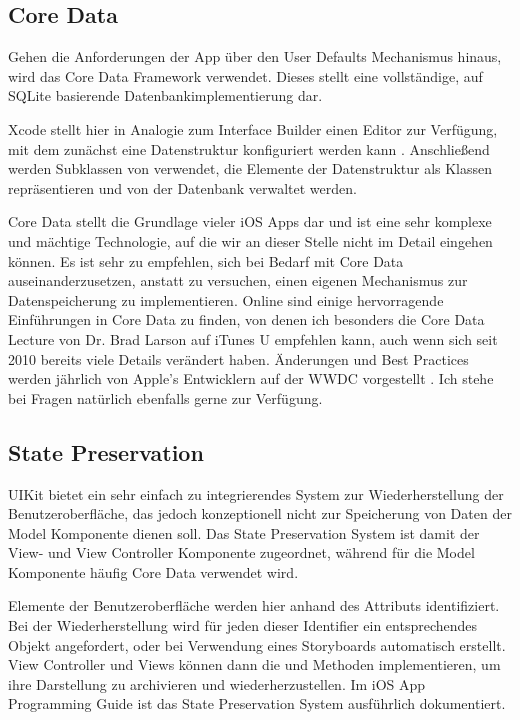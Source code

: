\documentclass[parskip=half, final]{scrreprt}
\begin{document}
\subsection{Core Data}\label{sec:coredata}

Gehen die Anforderungen der App über den User Defaults Mechanismus hinaus, wird das Core Data Framework verwendet. Dieses stellt eine vollständige, auf SQLite basierende Datenbankimplementierung dar.

Xcode stellt hier in Analogie zum Interface Builder einen Editor zur Verfügung, mit dem zunächst eine Datenstruktur konfiguriert werden kann . Anschließend werden Subklassen von  verwendet, die Elemente der Datenstruktur als Klassen repräsentieren und von der Datenbank verwaltet werden.


Core Data stellt die Grundlage vieler iOS Apps dar und ist eine sehr komplexe und mächtige Technologie, auf die wir an dieser Stelle nicht im Detail eingehen können. Es ist sehr zu empfehlen, sich bei Bedarf mit Core Data auseinanderzusetzen, anstatt zu versuchen, einen eigenen Mechanismus zur Datenspeicherung zu implementieren. Online sind einige hervorragende Einführungen in Core Data zu finden, von denen ich besonders die Core Data Lecture von Dr. Brad Larson auf iTunes U  empfehlen kann, auch wenn sich seit 2010 bereits viele Details verändert haben. Änderungen und Best Practices werden jährlich von Apple's Entwicklern auf der WWDC vorgestellt . Ich stehe bei Fragen natürlich ebenfalls gerne zur Verfügung.

\subsection{State Preservation}

UIKit bietet ein sehr einfach zu integrierendes System zur Wiederherstellung der Benutzeroberfläche, das jedoch konzeptionell nicht zur Speicherung von Daten der Model Komponente dienen soll. Das State Preservation System ist damit der View- und View Controller Komponente zugeordnet, während für die Model Komponente häufig Core Data verwendet wird.

Elemente der Benutzeroberfläche werden hier anhand des  Attributs identifiziert. Bei der Wiederherstellung wird für jeden dieser Identifier ein entsprechendes Objekt angefordert, oder bei Verwendung eines Storyboards automatisch erstellt. View Controller und Views können dann die  und  Methoden implementieren, um ihre Darstellung zu archivieren und wiederherzustellen. Im iOS App Programming Guide  ist das State Preservation System ausführlich dokumentiert.
\end{document}

